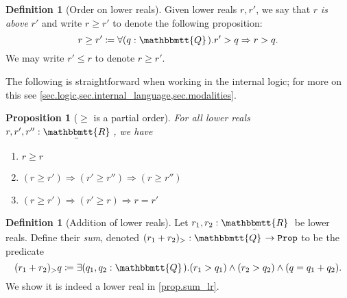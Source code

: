 \documentclass[11pt, oneside, article]{memoir}
\theoremstyle{plain}
\newtheorem{proposition}[theorem]{Proposition}
\theoremstyle{definition}
\newtheorem{definition}[theorem]{Definition}
\theoremstyle{remark}
\newcommand{\const}[1]{\mathtt{#1}}
\newcommand{\ubar}[1]{\underaccent{\bar}{#1}}
\newcommand{\internal}[1]{\raisebox{-.03ex}{$\mathbbmtt{#1}$}}
\newcommand{\hs}{\hspace{1.1pt}}
\newcommand{\tqq}{\internal{Q}\hs}
\newcommand{\trr}{\internal{R}\hs}
\newcommand{\tlrr}{\ubar{\trr}\hs}
\newcommand{\prop}{\const{Prop}}
\newcommand{\imp}{\Rightarrow}
\begin{document}
\begin{definition}[Order on lower reals]
Given lower reals $r,r'$,
we say that $r$ \emph{is above} $r'$ and write $r\geq r'$ to denote the following proposition:
\begin{equation}\label{eqn.real_order}
	r\geq r'\coloneqq\forall(q:\tqq).r'>q\imp r>q.
\end{equation}
We may write $r'\leq r$ to denote $r\geq r'$.
\end{definition}

The following is straightforward when working in the internal logic; for more on this see \cref{sec.logic,sec.internal_language,sec.modalities}.

\begin{proposition}[$\geq$ is a partial order]
For all lower reals $r,r',r'':\tlrr$, we have
\begin{enumerate}
	\item $r\geq r$
	\item $(r\geq r')\imp(r'\geq r'')\imp(r\geq r'')$
	\item $(r\geq r')\imp(r'\geq r)\imp r=r'$
\end{enumerate}
\end{proposition}

\begin{definition}[Addition of lower reals]\label{def.sum_lr}
Let $r_1,r_2:\tlrr$ be lower reals. Define their \emph{sum}, denoted $(r_1+r_2)_>:\tqq\to\prop$ to be the predicate
\begin{equation}\label{eqn.sum_lr}
(r_1+r_2)_>q\coloneqq\exists (q_1,q_2:\tqq).(r_1>q_1)\wedge (r_2> q_2)\wedge (q=q_1+q_2).
\end{equation}
We show it is indeed a lower real in \cref{prop.sum_lr}.
\end{definition}
\end{document}
